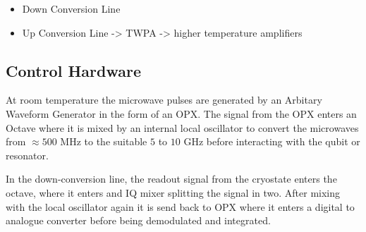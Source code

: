 \begin{itemize}
    \item Down Conversion Line
    \item Up Conversion Line -> TWPA -> higher temperature amplifiers 
\end{itemize}


\subsection{Control Hardware}
At room temperature the microwave pulses are generated by an Arbitary Waveform Generator in the form of an OPX. The signal from the OPX enters an Octave where it is mixed by an internal local oscillator to convert the microwaves from $\approx 500 \text{ MHz}$ to the suitable $5$ to $10 \text{ GHz}$ before interacting with the qubit or resonator. 

In the down-conversion line, the readout signal from the cryostate enters the octave, where it enters and IQ mixer splitting the signal in two. After mixing with the local oscillator again it is send back to OPX where it enters a digital to analogue converter before being demodulated and integrated.





